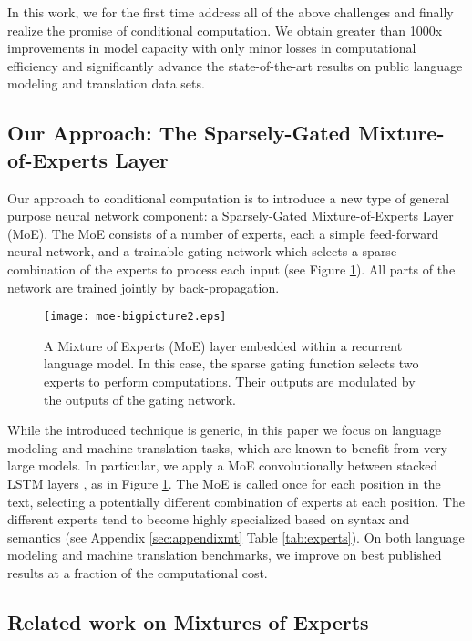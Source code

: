 \documentclass{article} %
\begin{document}
 In this work, we for the first time address all of the above challenges and finally realize the promise of conditional computation. We obtain greater than 1000x improvements in model capacity with only minor losses in computational efficiency and significantly advance the state-of-the-art results on public language modeling and translation data sets.
 
\subsection{Our Approach: The Sparsely-Gated Mixture-of-Experts Layer}

Our approach to conditional computation is to introduce a new type of general purpose neural network component: a Sparsely-Gated Mixture-of-Experts Layer (MoE).  The MoE consists of a number of experts, each a simple feed-forward neural network, and a trainable gating network which selects a sparse combination of the experts to process each input (see Figure \ref{fig:moe}).  All parts of the network are trained jointly by back-propagation.


\begin{figure}
    \texttt{[image: moe-bigpicture2.eps]}
    \caption{A Mixture of Experts (MoE) layer embedded within a recurrent language model. In this case, the sparse gating function selects two experts to perform computations. Their outputs are modulated by the outputs of the gating network.}
    \label{fig:moe}
\end{figure}

While the introduced technique is generic, in this paper we focus on language modeling and machine translation tasks, which are known to benefit from very large models. In particular, we apply a MoE convolutionally between stacked LSTM layers \citep{Hochreiter:1997:LSM}, as in Figure \ref{fig:moe}.  The MoE is called once for each position in the text, selecting a potentially different combination of experts at each position.  The different experts tend to become highly specialized based on syntax and semantics (see Appendix \ref{sec:appendixmt} Table \ref{tab:experts}).  On both language modeling and machine translation benchmarks, we improve on best published results at a fraction of the computational cost.

\subsection{Related work on Mixtures of Experts}
\end{document}
